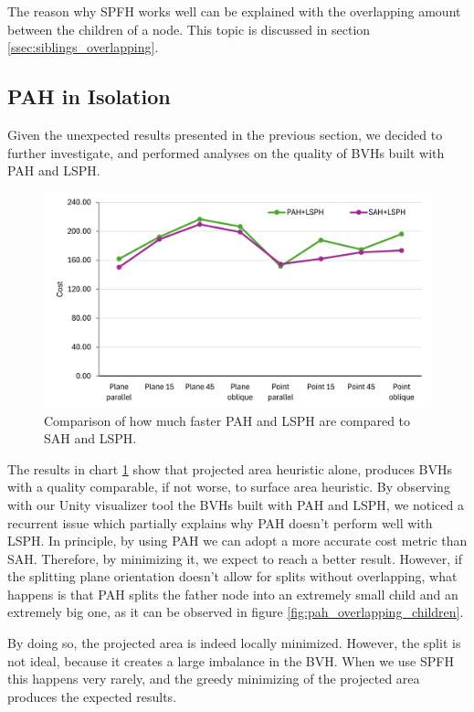 \documentclass{PoliMi_MasterThesis}
\begin{document}
The reason why SPFH works well can be explained with the overlapping amount between the children of a node. This topic is discussed in section \ref{ssec:siblings_overlapping}.

\subsection{PAH in Isolation} \label{ssec:pah_isolation}
Given the unexpected results presented in the previous section, we decided to further investigate, and performed analyses on the quality of BVHs built with PAH and LSPH.

\begin{figure}[H] 
	\centering
	\includegraphics[width=\textwidth]{Images/pah_isolation.png}
	\caption{Comparison of how much faster PAH and LSPH are compared to SAH and LSPH.}
	\label{fig:pah_isolation}
\end{figure}

The results in chart \ref{fig:pah_isolation} show that projected area heuristic alone, produces BVHs with a quality comparable, if not worse, to surface area heuristic. By observing with our Unity visualizer tool the BVHs built with PAH and LSPH, we noticed a recurrent issue which partially explains why PAH doesn't perform well with LSPH. In principle, by using PAH we can adopt a more accurate cost metric than SAH. Therefore, by minimizing it, we expect to reach a better result. However, if the splitting plane orientation doesn't allow for splits without overlapping, what happens is that PAH splits the father node into an extremely small child and an extremely big one, as it can be observed in figure \ref{fig:pah_overlapping_children}.

By doing so, the projected area is indeed locally minimized. However, the split is not ideal, because it creates a large imbalance in the BVH. When we use SPFH this happens very rarely, and the greedy minimizing of the projected area produces the expected results.
\end{document}
